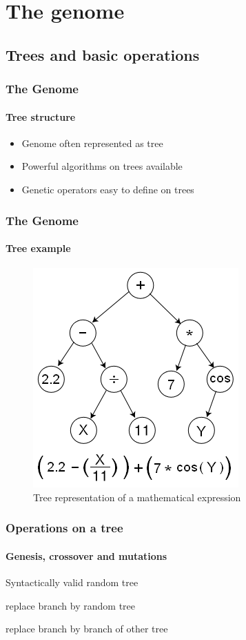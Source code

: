 \documentclass{beamer}
\begin{document}


\section{The genome} %
\label{sg:sec:the_genome}

\subsection{Trees and basic operations} %
\label{sg:ssub:trees_and_basic_operations}

\begin{frame}
	\frametitle{The Genome}
	\framesubtitle{Tree structure}
	\begin{itemize}
		\item<1-> Genome often represented as tree
		\item<2-> Powerful algorithms on trees available
		\item<3-> Genetic operators easy to define on trees
	\end{itemize}
\end{frame}

\begin{frame}
	\frametitle{The Genome}
	\framesubtitle{Tree example}
	\begin{figure}[h]
		\centering
			\includegraphics[width=0.6\textheight]{images/Genetic_Program_Tree.png}
		\caption{Tree representation of a mathematical expression}
		\label{sg:fig:images_Genetic_Program_Tree}
	\end{figure}
\end{frame}

\begin{frame}
	\frametitle{Operations on a tree}
	\framesubtitle{Genesis, crossover and mutations}
	\begin{description}
		\item<1->[Genesis:] Syntactically valid random tree
		\item<2->[Mutation:] replace branch by random tree
		\item<3->[Crossover:] replace branch by branch of other tree
	\end{description}
\end{frame}
\end{document}
